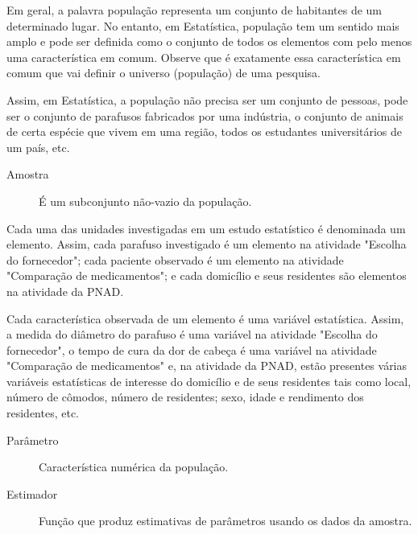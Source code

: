 Em geral, a palavra população representa um conjunto de habitantes de um determinado lugar. No entanto, em Estatística, população tem um sentido mais amplo e pode ser definida como o conjunto de todos os elementos com pelo menos uma característica em comum. Observe que é exatamente essa característica em comum que vai definir o universo (população) de uma pesquisa.

Assim, em Estatística, a população não precisa ser um conjunto de pessoas, pode ser o conjunto de parafusos fabricados por uma indústria, o conjunto de animais de certa espécie que vivem em uma região, todos os estudantes universitários de um país, etc.
\begin{description}
\item[Amostra]\leavevmode{}\label{est1-def-4} É um subconjunto não-vazio da população.
\end{description}

Cada uma das unidades investigadas em um estudo estatístico é denominada um elemento.  Assim, cada parafuso investigado é um elemento na atividade "Escolha do fornecedor"; cada paciente observado é um elemento na atividade "Comparação de medicamentos"; e cada domicílio e seus residentes são elementos na atividade da PNAD.

Cada característica observada de um elemento é uma variável estatística. Assim, a medida do diâmetro do parafuso é uma variável na atividade "Escolha do fornecedor", o tempo de cura da dor de cabeça é uma variável na atividade "Comparação de medicamentos" e, na atividade da PNAD, estão presentes várias variáveis estatísticas de interesse do domicílio e de seus residentes tais como local, número de cômodos, número de residentes; sexo, idade e rendimento dos residentes, etc.

\begin{description}
\item[{Parâmetro}] \leavevmode{}\label{est1-def-5} Característica numérica da população.

\end{description}
\begin{description}
\item[{Estimador}] \leavevmode{}\label{est1-def-6} Função que produz estimativas de parâmetros usando os dados da amostra.

\end{description}

